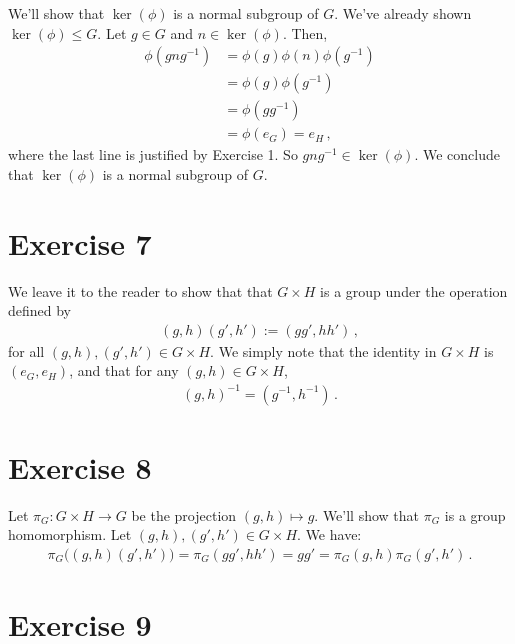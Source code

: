 \documentclass{article}
\begin{document}
We'll show that $\ker(\phi)$
is a normal subgroup of $G$. We've already shown $\ker(\phi) \leq G$.
Let $g \in G$ and $n \in \ker(\phi)$. Then,
\begin{align*}
    \phi(gng^{-1}) &= \phi(g) \phi(n) \phi(g^{-1}) \\
    &= \phi(g) \phi(g^{-1}) \\
    &= \phi(g g^{-1}) \\
    &= \phi(e_G) = e_H \,,
\end{align*}
where the last line is justified by Exercise 1.
So $gng^{-1} \in \ker(\phi)$.
We conclude that $\ker(\phi)$ is a normal subgroup of $G$. \qedsymbol

\section*{Exercise 7}

We leave it to the reader to show that
that $G \times H$ is a group under the operation
defined by
\begin{align*}
    (g,h) (g', h') := (gg', hh') \,,
\end{align*}
for all $(g, h), (g', h') \in G \times H$. We simply note that
the identity in $G \times H$ is $(e_G, e_H)$, and that for any $(g, h) \in G \times H$,
\begin{align*}
    (g, h)^{-1} = (g^{-1}, h^{-1}) \,.
\end{align*}

\section*{Exercise 8}

Let $\pi_G : G \times H \to G$
be the projection $(g,h) \mapsto g$.
We'll show that $\pi_G$ is a group
homomorphism. Let $(g, h), (g', h') \in G \times H$. We have:
\begin{align*}
    \pi_G \bigl( (g, h) (g', h') \bigr) = \pi_G (gg', hh') = gg'
    = \pi_G(g, h) \pi_G(g', h') \,.
\end{align*}

\section*{Exercise 9}
\end{document}
